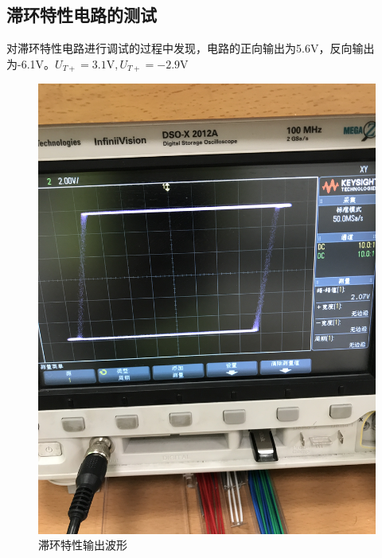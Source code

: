 \documentclass[UTF8,a4paper]{paper}
\begin{document}
\begin{multicols}{2}
\subsection{滞环特性电路的测试}
对滞环特性电路进行调试的过程中发现，电路的正向输出为5.6V，反向输出为-6.1V。$U_{T+}=3.1\mathrm{V},U_{T+}=-2.9\mathrm{V}$
\begin{figure}[H]
\centering
\includegraphics[width=\columnwidth,angle=-90]{wave/IMG_0660.jpg}
\caption{滞环特性输出波形}
\label{4}
\end{figure}
\end{multicols}
\end{document}
